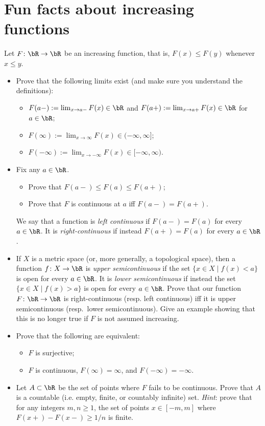 \documentclass[lang=cn,11pt]{elegantbook}
\begin{document}
\section{Fun facts about increasing functions}
    Let $F\colon\bR\to\bR$ be an increasing function, that is, $F(x)\le F(y)$ whenever $x\le y$. 
    \begin{itemize}
    \item[(a)]
      Prove that the following limits exist (and make sure you understand the definitions):
      \begin{itemize}
      \item[(i)]
        $F(a-):=\lim_{x\to a-}F(x)\in\bR$ and $F(a+):=\lim_{x\to a+}F(x)\in\bR$ for $a\in\bR$;
      \item[(ii)]
        $F(\infty):=\lim_{x\to\infty}F(x)\in(-\infty,\infty]$;
      \item[(iii)]
        $F(-\infty):=\lim_{x\to-\infty}F(x)\in[-\infty,\infty)$.
      \end{itemize}
    \item[(b)]
      Fix any $a\in\bR$.
      \begin{itemize}
      \item[(i)]
        Prove that $F(a-)\le F(a)\le F(a+)$;
      \item[(ii)]
        Prove that $F$ is continuous at $a$ iff $F(a-)=F(a+)$.
      \end{itemize}
      We say that a function is \emph{left continuous} if $F(a-)=F(a)$ for every $a\in\bR$. It is \emph{right-continuous} if instead $F(a+)=F(a)$ for every $a\in\bR$.
    \item[(c)]
      If $X$ is a metric space (or, more generally, a topological space), then a function $f\colon X\to\bR$ is \emph{upper semicontinuous} if the set $\{x\in X\mid f(x)<a\}$ is open for every $a\in\bR$. It is \emph{lower semicontinuous} if instead the set $\{x\in X\mid f(x)>a\}$ is open for every $a\in\bR$.
      Prove that our function $F\colon\bR\to\bR$ is right-continuous (resp. left continuous) iff it is upper semicontinuous (resp.\ lower semicontinuous). Give an example showing that this is no longer true if $F$ is not assumed increasing.
  \item[(d)]
    Prove that the following are equivalent:
    \begin{itemize}
    \item[(i)]
      $F$ is surjective;
    \item[(ii)]
      $F$ is continuous, $F(\infty)=\infty$, and $F(-\infty)=-\infty$.
    \end{itemize}
  \item[(e)]
    Let $A\subset\bR$ be the set of points where $F$ fails to be continuous. Prove that $A$ is a countable  (i.e. empty, finite, or countably infinite) set. \textit{Hint}: prove that for any integers $m,n\ge 1$, the set of points $x\in[-m,m]$ where $F(x+)-F(x-)\ge 1/n$ is finite.
  \end{itemize}
\end{document}
